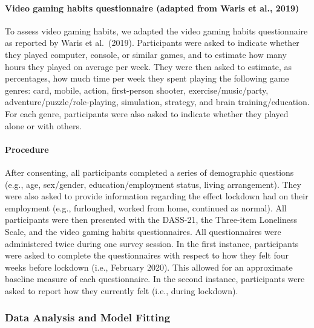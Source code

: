\documentclass[
  english,
  man,floatsintext]{apa6}
\let\oldparagraph\paragraph
\renewcommand{\paragraph}[1]{\oldparagraph{#1}\mbox{}}
\begin{document}
\hypertarget{video-gaming-habits-questionnaire-adapted-from-waris-et-al.-2019}{%
\paragraph{Video gaming habits questionnaire (adapted from Waris et al., 2019)}\label{video-gaming-habits-questionnaire-adapted-from-waris-et-al.-2019}}

To assess video gaming habits, we adapted the video gaming habits questionnaire as reported by Waris et al.~(2019). Participants were asked to indicate whether they played computer, console, or similar games, and to estimate how many hours they played on average per week. They were then asked to estimate, as percentages, how much time per week they spent playing the following game genres: card, mobile, action, first-person shooter, exercise/music/party, adventure/puzzle/role-playing, simulation, strategy, and brain training/education. For each genre, participants were also asked to indicate whether they played alone or with others.

\hypertarget{procedure}{%
\paragraph{Procedure}\label{procedure}}

After consenting, all participants completed a series of demographic questions (e.g., age, sex/gender, education/employment status, living arrangement). They were also asked to provide information regarding the effect lockdown had on their employment (e.g., furloughed, worked from home, continued as normal). All participants were then presented with the DASS-21, the Three-item Loneliness Scale, and the video gaming habits questionnaires. All questionnaires were administered twice during one survey session. In the first instance, participants were asked to complete the questionnaires with respect to how they felt four weeks before lockdown (i.e., February 2020). This allowed for an approximate baseline measure of each questionnaire. In the second instance, participants were asked to report how they currently felt (i.e., during lockdown).

\hypertarget{data-analysis-and-model-fitting}{%
\subsubsection{Data Analysis and Model Fitting}\label{data-analysis-and-model-fitting}}
\end{document}
